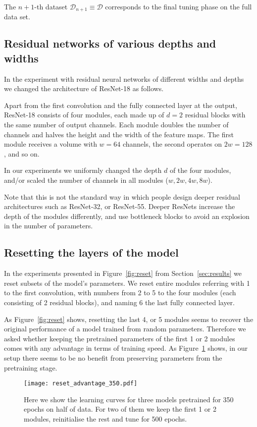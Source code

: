The $n+1$-th dataset $\mathcal{D}_{n+1} \equiv \mathcal{D}$ corresponds to the final tuning phase on the full data set.

\subsection{Residual networks of various depths and widths}
\label{sec:resnets}

In the experiment with residual neural networks of different widths and depths we changed the architecture of ResNet-18 \cite{He_2016_CVPR} as follows.

Apart from the first convolution and the fully connected layer at the output, ResNet-18 consists of four modules, each made up of $d=2$ residual blocks with the same number of output channels. Each module doubles the number of channels and halves the height and the width of the feature maps. The first module receives a volume with $w=64$ channels, the second operates on $2w=128$, and so on.

In our experiments we uniformly changed the depth $d$ of the four modules, and/or scaled the number of channels in all modules ($w, 2w, 4w, 8w$).

Note that this is not the standard way in which people design deeper residual architectures such as ResNet-32, or ResNet-55. Deeper ResNets increase the depth of the modules differently, and use bottleneck blocks to avoid an explosion in the number of parameters.

\subsection{Resetting the layers of the model}
\label{sec:reset_details}

In the experiments presented in Figure~\ref{fig:reset} from Section~\ref{sec:results} we reset subsets of the model's parameters. We reset entire modules referring with 1 to the first convolution, with numbers from 2 to 5 to the four modules (each consisting of 2 residual blocks), and naming 6 the last fully connected layer.

As Figure~\ref{fig:reset} shows, resetting the last 4, or 5 modules seems to recover the original performance of a model trained from random parameters. Therefore we asked whether keeping the pretrained parameters of the first 1 or 2 modules comes with any advantage in terms of training speed. As Figure~\ref{fig:advantage350} shows, in our setup there seems to be no benefit from preserving parameters from the pretraining stage.


\begin{figure}[h!tb]
    \centering%
    \texttt{[image: reset\_advantage\_350.pdf]}
    \caption{Here we show the learning curves for three models pretrained for 350 epochs on half of data. For two of them we keep the first 1 or 2 modules, reinitialise the rest and tune for 500 epochs.}
    \label{fig:advantage350}
\end{figure}





